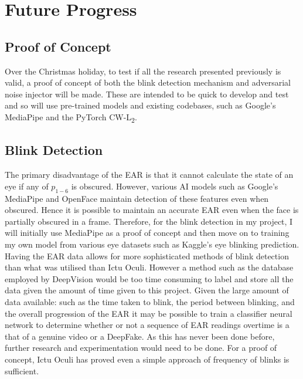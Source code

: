 \documentclass{article}
\begin{document}
\section{Future Progress} \label{sec:future-progress}
\subsection{Proof of Concept}

Over the Christmas holiday, to test if all the research presented previously is valid, a proof of concept of both the blink detection mechanism and adversarial noise injector will be made. These are intended to be quick to develop and test and so will use pre-trained models and existing codebases, such as Google's MediaPipe\cite{mediapipe} and the PyTorch CW-L\textsubscript{2}\cite{cwl2python}. 

\subsection{Blink Detection} \label{sec:future-blink}

The primary disadvantage of the EAR is that it cannot calculate the state of an eye if any of $p_{1-6}$ is obscured\cite{ictuoculi}. However, various AI models such as Google's MediaPipe\cite{mediapipe} and OpenFace\cite{openface} maintain detection of these features even when obscured. Hence it is possible to maintain an accurate EAR even when the face is partially obscured in a frame. Therefore, for the blink detection in my project, I will initially use MediaPipe as a proof of concept and then move on to training my own model from various eye datasets such as Kaggle's eye blinking prediction\cite{eyeblinkprediction}.\\

Having the EAR data allows for more sophisticated methods of blink detection than what was utilised than Ictu Oculi. However a method such as the database employed by DeepVision\cite{blinking-pattern} would be too time consuming to label and store all the data given the amount of time given to this project. Given the large amount of data available: such as the time taken to blink, the period between blinking, and the overall progression of the EAR it may be possible to train a classifier neural network to determine whether or not a sequence of EAR readings overtime is a that of a genuine video or a DeepFake. As this has never been done before, further research and experimentation would need to be done. For a proof of concept, Ictu Oculi has proved even a simple approach of frequency of blinks is sufficient\cite{ictuoculi}.
\end{document}
